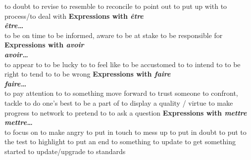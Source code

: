    {to doubt}
   {to revise}
   {to resemble}
   {to reconcile}
   {to point out}
   {to put up with}
   {to process/to deal with}
     {\sffamily\bfseries Expressions with {\em être}}\\
     {\bf {\em être\ldots}}\\
   {to be on time}
   {to be informed, aware}
   {to be at stake}
   {to be responsible for}
     {\sffamily\bfseries Expressions with {\em avoir}}\\
               {\bf {\em avoir\ldots}}\\
   {to appear to}
   {to be lucky to}
   {to feel like}
   {to be accustomed to}
   {to intend to}
   {to be right}
   {to tend to}
   {to be wrong}
     {\sffamily\bfseries Expressions with {\em faire}}\\
          {\bf {\em faire\ldots}}\\
   {to pay attention to}
   {to something move forward}
   {to trust someone}
   {to confront, tackle}
   {to do one’s best} 
   {to be a part of}
   {to display a quality / virtue}
   {to make progress}
   {to network}
   {to pretend to}
   {to ask a question}
     {\sffamily\bfseries Expressions with {\em mettre}}\\
               {\bf {\em mettre\ldots}}\\
   {to focus on}
   {to make angry}
   {to put in touch}
   {to mess up}
   {to put in doubt}
   {to put to the test}
   {to highlight}
   {to put an end to something}
   {to update}
   {to get something started}
 {to update/upgrade to standards}
